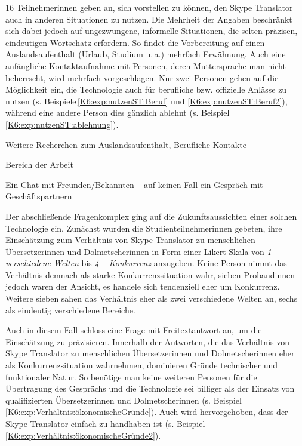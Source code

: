 \begin{sloppypar}
16 Teilnehmer{\textperiodcentered}innen geben an, sich vorstellen zu können, den Skype Translator auch in anderen Situationen zu nutzen. Die Mehrheit der Angaben beschränkt sich dabei jedoch auf ungezwungene, informelle Situationen, die selten präzisen, eindeutigen Wortschatz erfordern. So findet die Vorbereitung auf einen Auslandsaufenthalt (Urlaub, Studium u.\,a.) mehrfach Erwähnung. Auch eine anfängliche Kontaktaufnahme mit Personen, deren Muttersprache man nicht beherrscht, wird mehrfach vorgeschlagen. Nur zwei Personen gehen auf die Möglichkeit ein, die Technologie auch für berufliche bzw. offizielle Anlässe zu nutzen (s. Beispiele\,\ref{K6:exp:nutzenST:Beruf} und \ref{K6:exp:nutzenST:Beruf2}), während eine andere Person dies gänzlich ablehnt (s. Beispiel\,\ref{K6:exp:nutzenST:ablehnung}).\end{sloppypar}

\begin{example}
	\label{K6:exp:nutzenST:Beruf}
	Weitere Recherchen zum Auslandsaufenthalt, Berufliche Kontakte
\end{example}

\begin{example}
	\label{K6:exp:nutzenST:Beruf2}
	Bereich der Arbeit
\end{example}

\begin{example}
	\label{K6:exp:nutzenST:ablehnung}
	Ein Chat mit Freunden/Bekannten – auf keinen Fall ein \glqq Gespräch\grqq{} mit Geschäftspartnern
\end{example}

Der abschließende Fragenkomplex ging auf die Zukunftsaussichten einer solchen Technologie ein. Zunächst wurden die Studienteilnehmer{\textperiodcentered}innen gebeten, ihre Einschätzung zum Verhältnis von Skype Translator zu menschlichen Übersetzer{\textperiodcentered}innen und Dolmetscher{\textperiodcentered}innen in Form einer Likert-Skala von \emph{1 – verschiedene Welten} bis \emph{4 – Konkurrenz} anzugeben. Keine Person nimmt das Verhältnis demnach als starke Konkurrenzsituation wahr, sieben Proband{\textperiodcentered}innen jedoch waren der Ansicht, es handele sich tendenziell eher um Konkurrenz. Weitere sieben sahen das Verhältnis eher als zwei verschiedene Welten an, sechs als eindeutig verschiedene Bereiche.

Auch in diesem Fall schloss eine Frage mit Freitextantwort an, um die Einschätzung zu präzisieren. Innerhalb der Antworten, die das Verhältnis von Skype Translator zu menschlichen Übersetzer{\textperiodcentered}innen und Dolmetscher{\textperiodcentered}innen eher als Konkurrenzsituation wahrnehmen, dominieren Gründe technischer und funktionaler Natur. So benötige man keine weiteren Personen für die Übertragung des Gesprächs und die Technologie sei \glqq billiger\grqq{} als der Einsatz von qualifizierten Übersetzer{\textperiodcentered}innen und Dolmetscher{\textperiodcentered}innen (s. Beispiel\,\ref{K6:exp:Verhältnis:ökonomischeGründe}). Auch wird hervorgehoben, dass der Skype Translator einfach zu handhaben ist (s. Beispiel\,\ref{K6:exp:Verhältnis:ökonomischeGründe2}).


